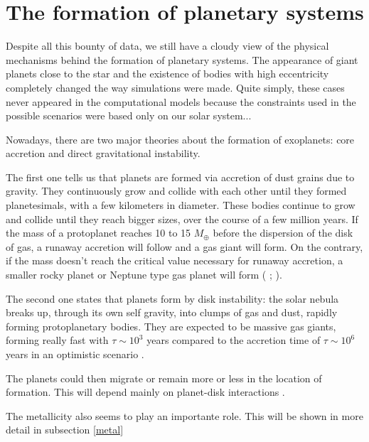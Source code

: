 \documentclass[dvips,12pt,a4paper]{report}
\begin{document}
\section {The formation of planetary systems}
\label {planets}
\indent Despite all this bounty of data, we still have a cloudy view of the physical mechanisms behind the formation of planetary systems. The appearance of giant planets close to the star and the existence of bodies with high eccentricity completely changed the way simulations were made. Quite simply, these cases never appeared in the computational models because the constraints used in the possible scenarios were based only on our solar system...

Nowadays, there are two major theories about the formation of exoplanets: core accretion and direct gravitational instability. 

The first one tells us that planets are formed via accretion of dust grains due to gravity. They continuously grow and collide with each other until they formed planetesimals, with a few kilometers in diameter. These bodies continue to grow and collide until they reach bigger sizes, over the course of a few million years. If the mass of a protoplanet reaches 10 to 15 $M_{\oplus}$ before the dispersion of the disk of gas, a runaway accretion will follow and a gas giant will form. On the contrary, if the mass doesn't reach the critical value necessary for runaway accretion, a smaller rocky planet or Neptune type gas planet will form (\citeauthor{Pollack-1996} \citeyear{Pollack-1996}; \citeauthor{Alibert-2006} \citeyear{Alibert-2006}). 

The second one states that planets form by disk instability: the solar nebula breaks up, through its own self gravity, into clumps of gas and dust, rapidly forming protoplanetary bodies. They are expected to be massive gas giants, forming really fast with  $\tau\sim10^3$ years compared to the accretion time of $\tau\sim10^6$ years in an optimistic scenario \citep{Boss-1997}. 

The planets could then migrate or remain more or less in the location of formation. This will depend mainly on planet-disk interactions \citep{Trilling-1998}.

The metallicity also seems to play an importante role. This will be shown in more detail in subsection \ref{metal}

\end{document}
